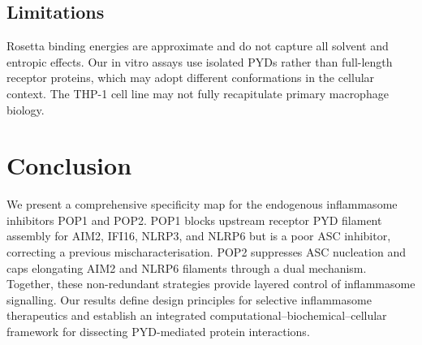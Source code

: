 \documentclass[12pt]{article}
\begin{document}
\subsection{Limitations}

Rosetta binding energies are approximate and do not capture all solvent and entropic effects. Our in vitro assays use isolated PYDs rather than full-length receptor proteins, which may adopt different conformations in the cellular context. The THP-1 cell line may not fully recapitulate primary macrophage biology.

\section{Conclusion}

We present a comprehensive specificity map for the endogenous inflammasome inhibitors POP1 and POP2. POP1 blocks upstream receptor PYD filament assembly for AIM2, IFI16, NLRP3, and NLRP6 but is a poor ASC inhibitor, correcting a previous mischaracterisation. POP2 suppresses ASC nucleation and caps elongating AIM2 and NLRP6 filaments through a dual mechanism. Together, these non-redundant strategies provide layered control of inflammasome signalling. Our results define design principles for selective inflammasome therapeutics and establish an integrated computational--biochemical--cellular framework for dissecting PYD-mediated protein interactions.



\end{document}
